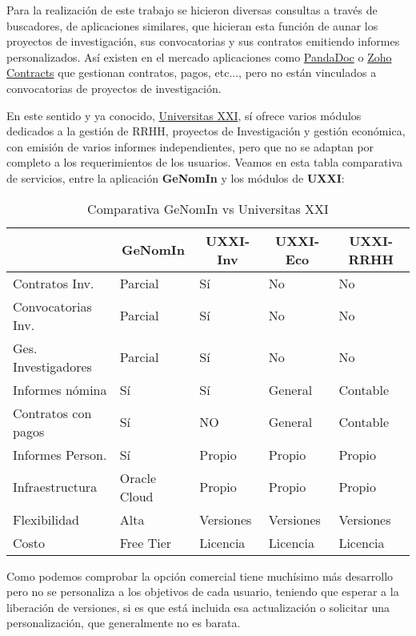 
Para la realización de este trabajo se hicieron diversas consultas a través de buscadores, de aplicaciones similares, que hicieran esta función de aunar los proyectos de investigación, sus convocatorias y sus contratos emitiendo informes personalizados.
Así existen en el mercado aplicaciones como \href{https://www.pandadoc.com/}{PandaDoc} o \href{https://www.zoho.com/es-xl/contracts/?lb=es-xl}{Zoho Contracts} que gestionan contratos, pagos, etc..., pero no están vinculados a convocatorias de proyectos de investigación.

En este sentido y ya conocido,  \href{https://www.universitasxxi.com/}{Universitas XXI}, sí ofrece varios módulos dedicados a la gestión de RRHH, proyectos de Investigación y gestión económica, con emisión de varios informes independientes, pero que no se adaptan por completo a los requerimientos de los usuarios.
Veamos en esta tabla comparativa de servicios, entre la aplicación \textbf{GeNomIn} y los módulos de \textbf{\acrshort{UXXI}}:

\begin{table}[h!]
	\centering
	\begin{tabular}{|l|l|l|l|l|}
		\hline
		\rowcolor{gray!20}
		\multicolumn{1}{c}{\textbf{Funcionalidad}\rule{0pt}{25pt}} & \multicolumn{1}{c}{\textbf{GeNomIn}} & \multicolumn{1}{c}{\textbf{UXXI-Inv}} &
		\multicolumn{1}{c}{\textbf{UXXI-Eco}} &
		\multicolumn{1}{c}{\textbf{UXXI-RRHH}} 
		\\
		\hline
		Contratos Inv. & Parcial & Sí & No & No\\
		Convocatorias Inv. & Parcial & Sí & No & No\\
		Ges. Investigadores & Parcial & Sí & No & No\\
		Informes nómina & Sí & Sí & General & Contable\\
		Contratos con pagos & Sí & NO & General & Contable\\
		Informes Person. & Sí & Propio & Propio & Propio\\
		Infraestructura & Oracle Cloud & Propio & Propio & Propio\\
		Flexibilidad & Alta & Versiones & Versiones & Versiones\\
		Costo & Free Tier & Licencia & Licencia & Licencia\\
		\hline
	\end{tabular}
	\caption{Comparativa GeNomIn vs Universitas XXI}
	\label{tab:comGenUniv}
\end{table}

Como podemos comprobar la opción comercial tiene muchísimo más desarrollo pero no se personaliza a los objetivos de cada usuario, teniendo que esperar a la liberación de versiones, si es que está incluida esa actualización o solicitar una personalización, que generalmente no es barata.